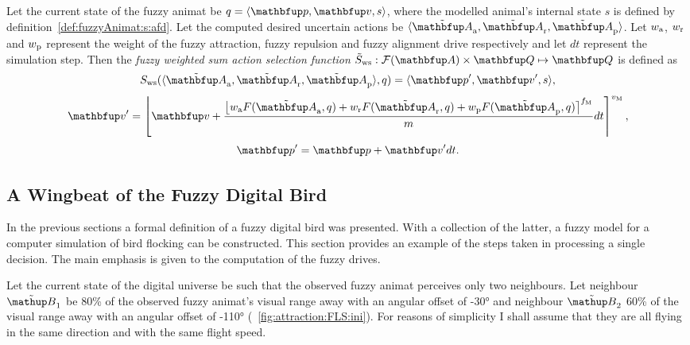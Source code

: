 \begin{definition}
\label{def:fuzzyAnimat:Sws:afd}
Let the current state of the fuzzy animat be $q=\langle\vect{p},\vect{v},s\rangle$, where the modelled animal's internal state $s$ is defined by definition~\ref{def:fuzzyAnimat:s:afd}. Let the computed desired uncertain actions be $\langle \fset{A}_\textnormal{a},\fset{A}_\textnormal{r},\fset{A}_\textnormal{p}\rangle$. Let $w_\textnormal{a}$, $w_\textnormal{r}$ and $w_\textnormal{p}$ represent the weight of the fuzzy attraction, fuzzy repulsion and fuzzy alignment drive respectively and let $dt$ represent the simulation step. Then the \emph{fuzzy weighted sum action selection function} $\ffunc{S}_\textnormal{ws}: \fpowset{\set{A}} \times \set{Q} \mapsto \set{Q}$ is defined as
\begin{equation}
S_\textnormal{ws}(\langle \fset{A}_\textnormal{a},\fset{A}_\textnormal{r},\fset{A}_\textnormal{p}\rangle, q) = \langle\vect{p}', \vect{v}', s\rangle, \label{eq:fuzzyAnimat:Sws0:afd}
\end{equation}
\begin{equation}
\vect{v}' = \left\lfloor {\vect{v} + \frac{\left\lfloor w_\textnormal{a}F(\fset{A}_\textnormal{a},q) + w_\textnormal{r}F(\fset{A}_\textnormal{r},q) + w_\textnormal{p}F(\fset{A}_\textnormal{p},q) \right\rceil^{f_\textnormal{M}}}{m}}dt \right\rceil^{v_\textnormal{M}},
\end{equation}
\begin{equation}
\vect{p}' = \vect{p} + \vect{v}'dt. \label{eq:fuzzyAnimat:Sws2:afd}
\end{equation}
\end{definition}
 
\subsection{A Wingbeat of the Fuzzy Digital Bird}
\label{sec:fuzzyAnimat:decision}
In the previous sections a formal definition of a fuzzy digital bird was presented. With a collection of the latter, a fuzzy model for a computer simulation of bird flocking can be constructed. This section provides an example of the steps taken in processing a single decision. The main emphasis is given to the computation of the fuzzy drives.

Let the current state of the digital universe be such that the observed fuzzy animat perceives only two neighbours. Let neighbour $\fautom{B}_1$ be 80\% of the observed fuzzy animat's visual range away with an angular offset of \ang{-30} and neighbour $\fautom{B}_2$ 60\% of the visual range away with an angular offset of \ang{-110} (\fig~\ref{fig:attraction:FLS:ini}). For reasons of simplicity I shall assume that they are all flying in the same direction and with the same flight speed. 

